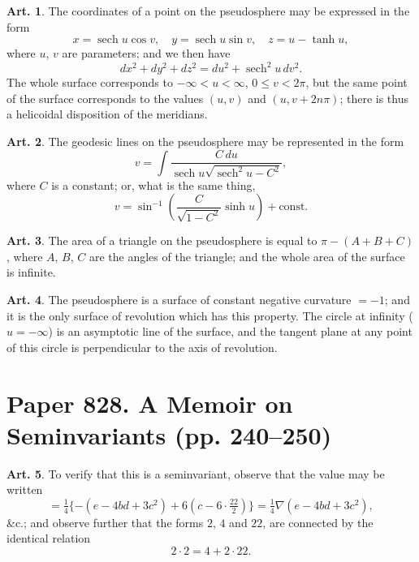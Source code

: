 \documentclass[11pt,a4paper]{article}
\theoremstyle{definition}
\newtheorem{art}{Art.}[section]
\DeclareMathOperator{\sech}{sech}
\begin{document}
\newpage
\begin{art}
The coordinates of a point on the pseudosphere may be expressed in the form
\[
x = \sech u \cos v, \quad y = \sech u \sin v, \quad z = u - \tanh u,
\]
where $u$, $v$ are parameters; and we then have
\[
dx^2 + dy^2 + dz^2 = du^2 + \sech^2 u \, dv^2.
\]
The whole surface corresponds to $-\infty < u < \infty$, $0 \le v < 2\pi$, but the same point of the surface corresponds to the values $(u,v)$ and $(u, v + 2n\pi)$; there is thus a helicoidal disposition of the meridians.
\end{art}

\begin{art}
The geodesic lines on the pseudosphere may be represented in the form
\[
v = \int \frac{C\,du}{\sech u \sqrt{\sech^2 u - C^2}},
\]
where $C$ is a constant; or, what is the same thing,
\[
v = \sin^{-1}\left(\frac{C}{\sqrt{1-C^2}} \sinh u\right) + \text{const}.
\]
\end{art}

\begin{art}
The area of a triangle on the pseudosphere is equal to $\pi - (A + B + C)$, where $A$, $B$, $C$ are the angles of the triangle; and the whole area of the surface is infinite.
\end{art}

\begin{art}
The pseudosphere is a surface of constant negative curvature $= -1$; and it is the only surface of revolution which has this property. The circle at infinity ($u = -\infty$) is an asymptotic line of the surface, and the tangent plane at any point of this circle is perpendicular to the axis of revolution.
\end{art}

\newpage
\section{Paper 828. A Memoir on Seminvariants (pp. 240--250)}


\begin{art}
To verify that this is a seminvariant, observe that the value may be written
\[
= \tfrac{1}{4}\{- (e - 4bd + 3c^2) + 6(c - 6\cdot\tfrac{22}{2})\} = \tfrac{1}{4}\nabla(e - 4bd + 3c^2),
\]
\&c.; and observe further that the forms $2$, $4$ and $22$, are connected by the identical relation
\[
2 \cdot 2 = 4 + 2 \cdot 22.
\]
\end{art}
\end{document}
